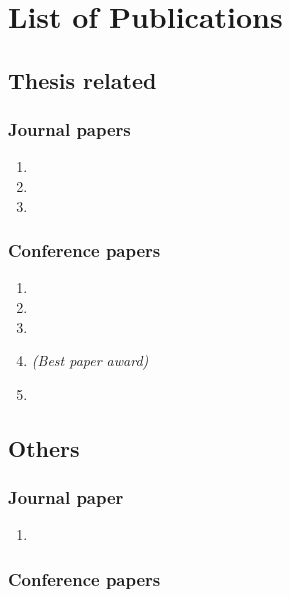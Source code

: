 \chapter{List of Publications}

\section*{Thesis related}
\subsection*{Journal papers}

\begin{sloppypar}
\begin{enumerate}
  \item {}
  \item {}
  \item {}
\end{enumerate}
\end{sloppypar}

\subsection*{Conference papers}

\begin{enumerate}
  \item {}
  \item {}
  \item {}
  \item {} \emph{(Best paper award)}
  \item {}
\end{enumerate}

\section*{Others}
\subsection*{Journal paper}

\begin{enumerate}
    \item {}
\end{enumerate}

\subsection*{Conference papers}

